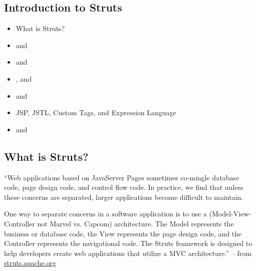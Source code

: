 \begin{ifhtml}
  \begin{s5slide}
    \section{Introduction to Struts}
    \begin{itemize}
      \item What is Struts?
      \item {} and 
      \item {} and 
      \item {},  and 
      \item {} and 
      \item JSP, JSTL, Custom Tags, and Expression Language
      \item {} 
        and 
    \end{itemize}
  \end{s5slide}

  \begin{s5slide}
    \section{What is Struts?}
     ``Web applications based on JavaServer Pages sometimes co-mingle database code, page design code, and control flow code. In practice, we find that unless these concerns are separated, larger applications become difficult to maintain.

One way to separate concerns in a software application is to use a \MVC (Model-View-Controller not Marvel vs. Capcom) 
architecture. The Model represents the business or database code, the View represents the page design code, and the Controller represents the navigational code. The Struts framework is designed to help developers create web applications that utilize a MVC architecture.'' -- from 
\href{http://struts.apache.org}{struts.apache.org}

    \begin{slideshow}
      \item {}
      \item {}
    \end{slideshow}


\end{s5slide}
\end{ifhtml}
